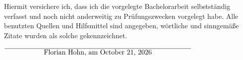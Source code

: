 \documentclass[12pt,oneside,a4paper,parskip]{scrbook}
\def\BaAuthor{Florian Hohn}
\begin{document}

\printbibliography
{}				



Hiermit versichere ich, dass ich die vorgelegte Bachelorarbeit selbstständig verfasst und noch nicht anderweitig zu Prüfungszwecken vorgelegt habe. Alle benutzten Quellen und Hilfsmittel sind angegeben, wörtliche und sinngemäße Zitate wurden als solche gekennzeichnet.

\vspace{20pt}
\begin{flushright}
$\overline{~~~~~~~~~~~~~~~~~\mbox{\BaAuthor, am \today}~~~~~~~~~~~~~~~~~}$
\end{flushright}
\pagebreak

\end{document}
